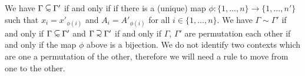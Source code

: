 We have $\Gamma \subseteqsim \Gamma'$ if and only if
if there is a (unique) map $\phi:\{1,\ldots,n\} \rightarrow \{1,\ldots,n'\}$
such that $x_{i}=x'_{\phi(i)}$ and $A_{i}=A'_{\phi(i)}$ for all $i \in \{1,\ldots,n\}$.
We have  $\Gamma \sim \Gamma'$ if and only if  $\Gamma \subseteqsim \Gamma'$
and  $\Gamma \supseteqsim \Gamma'$ if and only if $\Gamma$, $\Gamma'$ are permutation
each other if and only if the map $\phi$ above is a bijection. We do not identify two contexts
which are one a permutation of the other, therefore we will need a rule to move from one to the other.






%
%
%
%
%




\\

